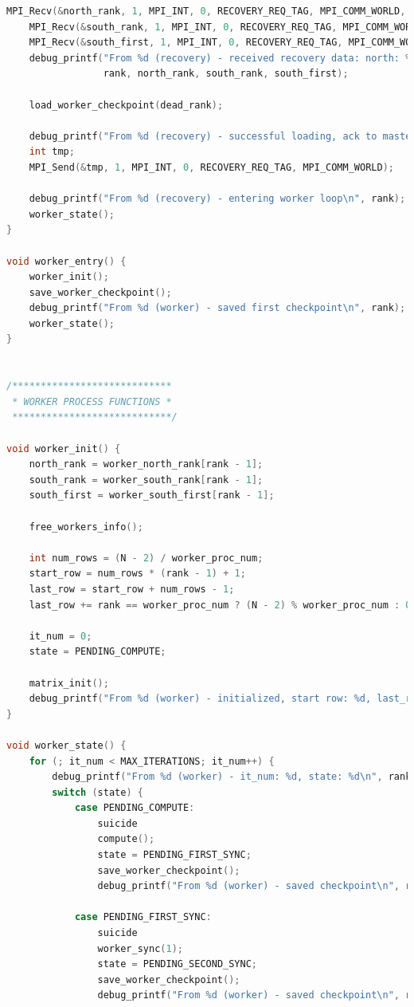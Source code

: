 \documentclass[a4paper]{article}
\begin{document}
\begin{lstlisting}[caption=jac\_3d\_mpi\_ft.c, label={lst:2}, language=C]
    MPI_Recv(&north_rank, 1, MPI_INT, 0, RECOVERY_REQ_TAG, MPI_COMM_WORLD, &status);
    MPI_Recv(&south_rank, 1, MPI_INT, 0, RECOVERY_REQ_TAG, MPI_COMM_WORLD, &status);
    MPI_Recv(&south_first, 1, MPI_INT, 0, RECOVERY_REQ_TAG, MPI_COMM_WORLD, &status);
    debug_printf("From %d (recovery) - received recovery data: north: %d, south: %d, south first: %d\n",
                 rank, north_rank, south_rank, south_first);

    load_worker_checkpoint(dead_rank);

    debug_printf("From %d (recovery) - successful loading, ack to master\n", rank);
    int tmp;
    MPI_Send(&tmp, 1, MPI_INT, 0, RECOVERY_REQ_TAG, MPI_COMM_WORLD);

    debug_printf("From %d (recovery) - entering worker loop\n", rank);
    worker_state();
}

void worker_entry() {
    worker_init();
    save_worker_checkpoint();
    debug_printf("From %d (worker) - saved first checkpoint\n", rank);
    worker_state();
}


/****************************
 * WORKER PROCESS FUNCTIONS *
 ****************************/

void worker_init() {
    north_rank = worker_north_rank[rank - 1];
    south_rank = worker_south_rank[rank - 1];
    south_first = worker_south_first[rank - 1];

    free_workers_info();

    int num_rows = (N - 2) / worker_proc_num;
    start_row = num_rows * (rank - 1) + 1;
    last_row = start_row + num_rows - 1;
    last_row += rank == worker_proc_num ? (N - 2) % worker_proc_num : 0;

    it_num = 0;
    state = PENDING_COMPUTE;

    matrix_init();
    debug_printf("From %d (worker) - initialized, start row: %d, last_row: %d\n", rank, start_row, last_row);
}

void worker_state() {
    for (; it_num < MAX_ITERATIONS; it_num++) {
        debug_printf("From %d (worker) - it_num: %d, state: %d\n", rank, it_num, state);
        switch (state) {
            case PENDING_COMPUTE:
                suicide
                compute();
                state = PENDING_FIRST_SYNC;
                save_worker_checkpoint();
                debug_printf("From %d (worker) - saved checkpoint\n", rank);

            case PENDING_FIRST_SYNC:
                suicide
                worker_sync(1);
                state = PENDING_SECOND_SYNC;
                save_worker_checkpoint();
                debug_printf("From %d (worker) - saved checkpoint\n", rank);


\end{lstlisting}
\end{document}
